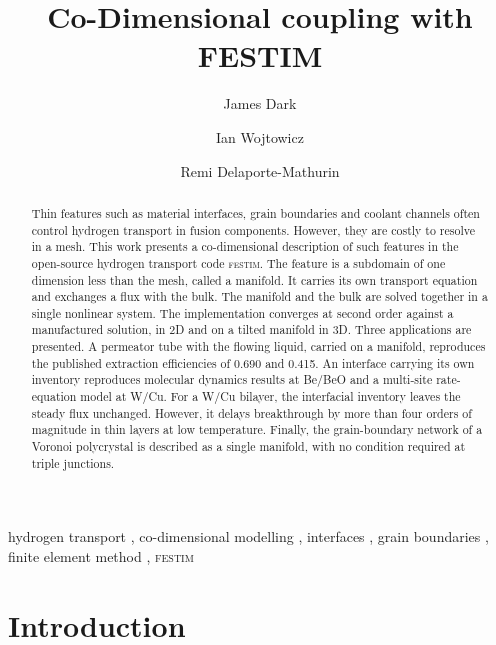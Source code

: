 \documentclass[5p]{elsarticle}
\newcommand{\FESTIM}{\textsc{festim}}
\begin{document}
\begin{frontmatter}

\title{Co-Dimensional coupling with FESTIM}

\author[mit]{James Dark}
\author[umn]{Ian Wojtowicz}
\author[mit]{Remi Delaporte-Mathurin}

\address[mit]{Massachusetts Institute of Technology, Cambridge, MA, USA}
\address[umn]{Department of Mechanical Engineering, University of Minnesota, 111 Church Street SE, Minneapolis, MN 55455, USA}

\begin{abstract}
Thin features such as material interfaces, grain boundaries and coolant channels often control hydrogen transport in fusion components.
However, they are costly to resolve in a mesh.
This work presents a co-dimensional description of such features in the open-source hydrogen transport code \FESTIM{}.
The feature is a subdomain of one dimension less than the mesh, called a manifold.
It carries its own transport equation and exchanges a flux with the bulk.
The manifold and the bulk are solved together in a single nonlinear system.
The implementation converges at second order against a manufactured solution, in 2D and on a tilted manifold in 3D.
Three applications are presented.
A permeator tube with the flowing liquid, carried on a manifold, reproduces the published extraction efficiencies of \num{0.690} and \num{0.415}.
An interface carrying its own inventory reproduces molecular dynamics results at Be/BeO and a multi-site rate-equation model at W/Cu.
For a W/Cu bilayer, the interfacial inventory leaves the steady flux unchanged.
However, it delays breakthrough by more than four orders of magnitude in thin layers at low temperature.
Finally, the grain-boundary network of a Voronoi polycrystal is described as a single manifold, with no condition required at triple junctions.
\end{abstract}

\begin{keyword}
    hydrogen transport \sep
    co-dimensional modelling \sep
    interfaces \sep
    grain boundaries \sep
    finite element method \sep
    \FESTIM{}
\end{keyword}

\end{frontmatter}

\section{Introduction}
\label{sec:intro}
\end{document}
